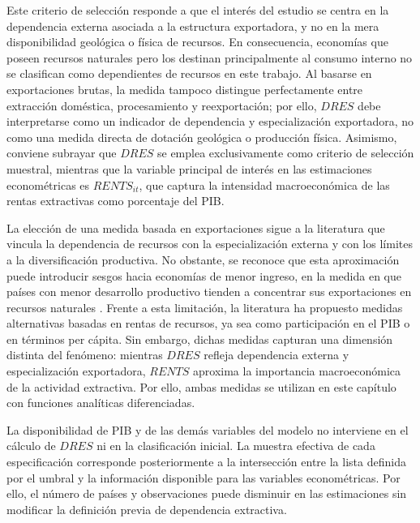 \documentclass[../../TFM.tex]{subfiles}
\begin{document}
	Este criterio de selección responde a que el interés del estudio se
	centra en la dependencia externa asociada a la estructura exportadora, y
	no en la mera disponibilidad geológica o física de recursos. En
	consecuencia, economías que poseen recursos naturales pero los destinan
	principalmente al consumo interno no se clasifican como dependientes de
	recursos en este trabajo. Al basarse en exportaciones brutas, la medida tampoco
	distingue perfectamente entre extracción doméstica, procesamiento y
	reexportación; por ello, $DRES$ debe interpretarse como un indicador de
	dependencia y especialización exportadora, no como una medida directa de
	dotación geológica o producción física. Asimismo, conviene subrayar que $DRES$ se
	emplea exclusivamente como criterio de selección muestral, mientras que
	la variable principal de interés en las estimaciones econométricas es
	$RENTS_{it}$, que captura la intensidad macroeconómica de las rentas
	extractivas como porcentaje del PIB.

	La elección de una medida basada en exportaciones sigue a la literatura
	que vincula la dependencia de recursos con la especialización externa y
	con los límites a la diversificación productiva. No obstante, se reconoce
	que esta aproximación puede introducir sesgos hacia economías de menor
	ingreso, en la medida en que países con menor desarrollo productivo
	tienden a concentrar sus exportaciones en recursos naturales
	\parencite{Brunnschweiler2008}. Frente a esta limitación, la literatura ha
	propuesto medidas alternativas basadas en rentas de recursos, ya sea como
	participación en el PIB o en términos per cápita. Sin embargo, dichas
	medidas capturan una dimensión distinta del fenómeno: mientras $DRES$
	refleja dependencia externa y especialización exportadora, $RENTS$
	aproxima la importancia macroeconómica de la actividad extractiva. Por
	ello, ambas medidas se utilizan en este capítulo con funciones analíticas
	diferenciadas.

	La disponibilidad de PIB y de las demás variables del modelo no interviene
	en el cálculo de $DRES$ ni en la clasificación inicial. La muestra efectiva de
	cada especificación corresponde posteriormente a la intersección entre la
	lista definida por el umbral y la información disponible para las variables
	econométricas. Por ello, el número de países y observaciones puede disminuir
	en las estimaciones sin modificar la definición previa de dependencia
	extractiva.
\end{document}
